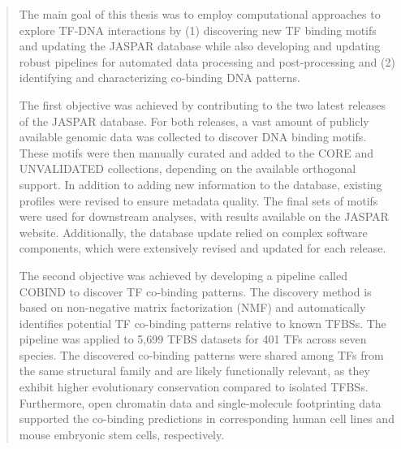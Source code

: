 \begin{abstract}
    The main goal of this thesis was to employ computational approaches to explore TF-DNA interactions by (1) discovering new TF binding motifs and updating the JASPAR database while also developing and updating robust pipelines for automated data processing and post-processing and (2) identifying and characterizing co-binding DNA patterns.

    The first objective was achieved by contributing to the two latest releases of the JASPAR database. For both releases, a vast amount of publicly available genomic data was collected to discover DNA binding motifs. These motifs were then manually curated and added to the CORE and UNVALIDATED collections, depending on the available orthogonal support. In addition to adding new information to the database, existing profiles were revised to ensure metadata quality. The final sets of motifs were used for downstream analyses, with results available on the JASPAR website. Additionally, the database update relied on complex software components, which were extensively revised and updated for each release.

    The second objective was achieved by developing a pipeline called COBIND to discover TF co-binding patterns. The discovery method is based on non-negative matrix factorization (NMF) and automatically identifies potential TF co-binding patterns relative to known TFBSs. The pipeline was applied to 5,699 TFBS datasets for 401 TFs across seven species. The discovered co-binding patterns were shared among TFs from the same structural family and are likely functionally relevant, as they exhibit higher evolutionary conservation compared to isolated TFBSs. Furthermore, open chromatin data and single-molecule footprinting data supported the co-binding predictions in corresponding human cell lines and mouse embryonic stem cells, respectively.

\end{abstract}

